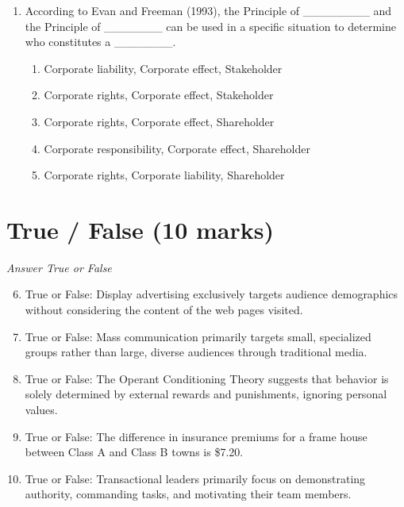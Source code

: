 \documentclass[12pt]{article}
\begin{document}
\begin{enumerate}[label=\arabic*.]
\begin{enumerate}[label=(\alph*)]
    \item \$40.05
    \item \$35.50
    \item \$75.20
    \item \$10.00
\end{enumerate}
\item According to Evan and Freeman (1993), the Principle of \_\_\_\_\_\_\_\_ and the Principle of \_\_\_\_\_\_\_ can be used in a specific situation to determine who constitutes a \_\_\_\_\_\_\_.
\begin{enumerate}[label=(\alph*)]
    \item Corporate liability, Corporate effect, Stakeholder
    \item Corporate rights, Corporate effect, Stakeholder
    \item Corporate rights, Corporate effect, Shareholder
    \item Corporate responsibility, Corporate effect, Shareholder
    \item Corporate rights, Corporate liability, Shareholder
\end{enumerate}
\end{enumerate}

\section*{True / False (10 marks)}
\textit{Answer True or False}
\begin{enumerate}[label=\arabic*.]
\setcounter{enumi}{5}
\item True or False: Display advertising exclusively targets audience demographics without considering the content of the web pages visited.
\item True or False: Mass communication primarily targets small, specialized groups rather than large, diverse audiences through traditional media.
\item True or False: The Operant Conditioning Theory suggests that behavior is solely determined by external rewards and punishments, ignoring personal values.
\item True or False: The difference in insurance premiums for a frame house between Class A and Class B towns is \$7.20.
\item True or False: Transactional leaders primarily focus on demonstrating authority, commanding tasks, and motivating their team members.
\end{enumerate}
\end{document}
